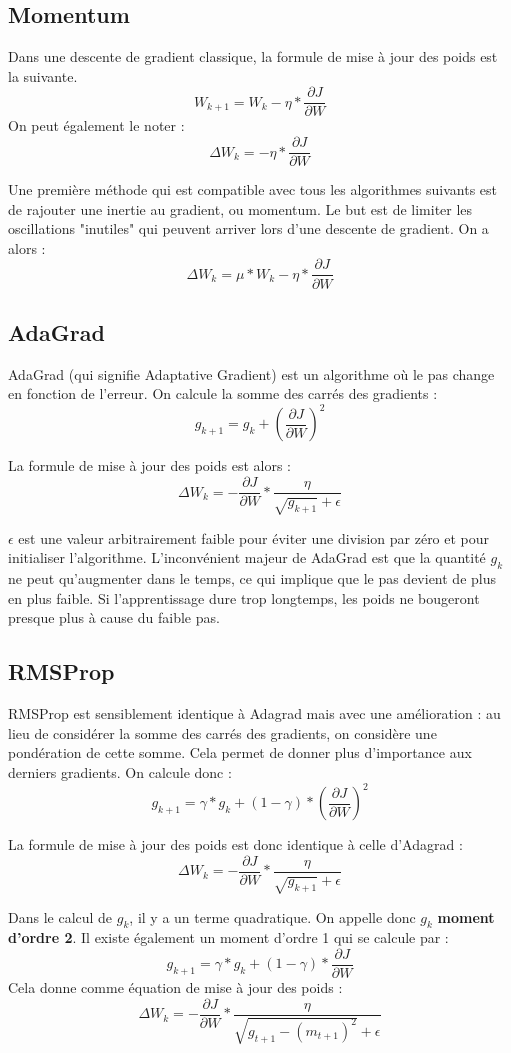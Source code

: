 \subsection{Momentum}
Dans une descente de gradient classique, la formule de mise à jour des poids est la suivante. 
\[W_{k+1} = W_k - \eta * \frac{\partial J}{\partial W}\]
On peut également le noter :
\[\Delta W_k = -\eta*\frac{\partial J}{\partial W}\]

Une première méthode qui est compatible avec tous les algorithmes suivants est de rajouter une inertie au gradient, ou momentum. Le but est de limiter les oscillations "inutiles" qui peuvent arriver lors d'une descente de gradient. On a alors : 
\[\Delta W_k  = \mu * W_k - \eta*\frac{\partial J}{\partial W}\]

\subsection{AdaGrad}
AdaGrad (qui signifie Adaptative Gradient) est un algorithme où le pas change en fonction de l'erreur. 
On calcule la somme des carrés des gradients : 
\[g_{k+1} = g_k + (\frac{\partial J}{\partial W})^2\]

La formule de mise à jour des poids est alors : 
\[\Delta W_k = -\frac{\partial J}{\partial W}*\frac{\eta}{\sqrt{g_{k+1}}+\epsilon}\]

$\epsilon$ est une valeur arbitrairement faible pour éviter une division par zéro et pour initialiser l'algorithme. L'inconvénient majeur de AdaGrad est que la quantité $g_k$ ne peut qu'augmenter dans le temps, ce qui implique que le pas devient de plus en plus faible. Si l'apprentissage dure trop longtemps, les poids ne bougeront presque plus à cause du faible pas.

\subsection{RMSProp}
RMSProp est sensiblement identique à Adagrad mais avec une amélioration : au lieu de considérer la somme des carrés des gradients, on considère une pondération de cette somme. Cela permet de donner plus d'importance aux derniers gradients. 
On calcule donc : 
\[g_{k+1} = \gamma*g_k + (1-\gamma)*(\frac{\partial J}{\partial W})^2\]

La formule de mise à jour des poids est donc identique à celle d'Adagrad : 
\[\Delta W_k = -\frac{\partial J}{\partial W}*\frac{\eta}{\sqrt{g_{k+1}}+\epsilon}\]

Dans le calcul de $g_k$, il y a un terme quadratique. On appelle donc $g_k$ \textbf{moment d'ordre 2}. Il existe également un moment d'ordre 1 qui se calcule par :
\[g_{k+1} = \gamma*g_k + (1-\gamma)*\frac{\partial J}{\partial W}\]
Cela donne comme équation de mise à jour des poids : 
\[\Delta W_k = -\frac{\partial J}{\partial W}*\frac{\eta}{\sqrt{g_{t+1}-(m_{t+1})^2}+\epsilon}\]


